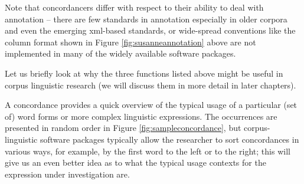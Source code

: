 Note that concordancers differ with respect to their ability to deal with annotation -- there are few standards in annotation especially in older corpora and even the emerging xml-based standards, or wide-spread conventions like the column format shown in Figure \ref{fig:susanneannotation} above are not implemented in many of the widely available software packages.

Let us briefly look at why the three functions listed above might be useful in corpus linguistic research (we will discuss them in more detail in later chapters).

A concordance provides a quick overview of the typical usage of a particular (set of) word forms or more complex linguistic expressions. The occurrences are presented in random order in Figure \ref{fig:sampleconcordance}, but corpus-linguistic software packages typically allow the researcher to sort concordances in various ways, for example, by the first word to the left or to the right; this will give us an even better idea as to what the typical usage contexts for the expression under investigation are.

